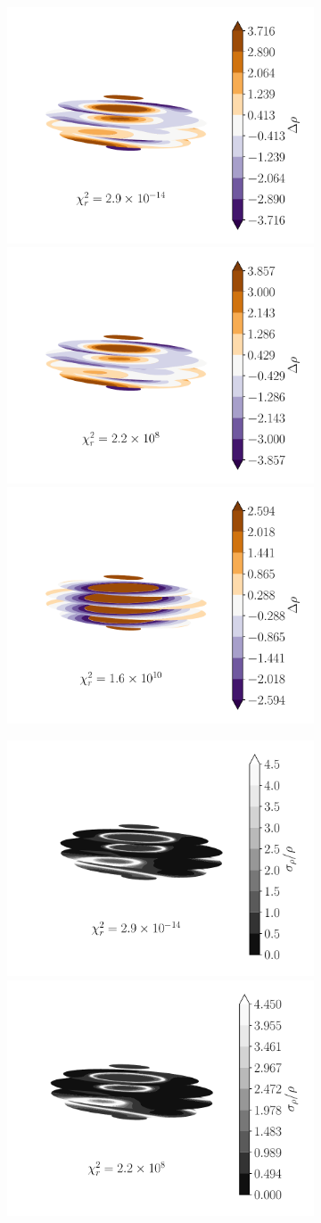 \documentclass[fleqn,usenatbib]{mnras}
\begin{document}
{\begin{landscape}
\begin{figure}
\begin{subfigure}{0.49\linewidth}
        \includegraphics[width=0.33\linewidth]{figs/out-diff-likelihood.pdf}\hfill
        \includegraphics[width=0.33\linewidth]{figs/out-diff-harmonic.pdf}\hfill
        \includegraphics[width=0.33\linewidth]{figs/out-diff-lumpy.pdf}

        \includegraphics[width=0.33\linewidth]{figs/out-unc-likelihood.pdf}\hfill
        \includegraphics[width=0.33\linewidth]{figs/out-unc-harmonic.pdf}\hfill
        \hspace{0.33\linewidth}


\end{subfigure}
\end{figure}
\end{landscape}}
\end{document}
